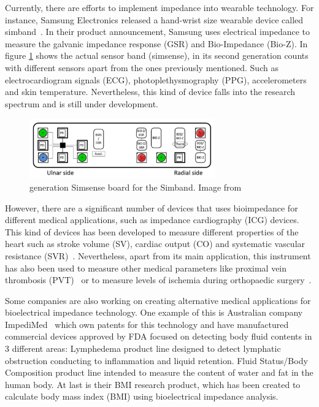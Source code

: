 Currently, there are efforts to implement impedance into wearable technology. For instance, Samsung Electronics released a hand-wrist size wearable device called simband~\cite{simsense}. In their product announcement, Samsung uses electrical impedance to measure the galvanic impedance response (GSR) and Bio-Impedance (Bio-Z). In figure \ref{fig:simsense} shows the actual sensor band (simsense), in its second generation counts with different sensors apart from the ones previously mentioned. Such as electrocardiogram signals (ECG), photoplethysmography (PPG), accelerometers and skin temperature. Nevertheless, this kind of device falls into the research spectrum and is still under development.

\begin{figure}[!htpb]
	\centering
	\includegraphics[width=8cm,keepaspectratio]{figure10}    
	\caption[ generation Simsense board for the Simband]{ generation Simsense board for the Simband. Image from \cite{simsense}}
	\label{fig:simsense}
\end{figure}

However, there are a significant number of devices that uses bioimpedance for different medical applications, such as impedance cardiography (ICG) devices. This kind of devices has been developed to measure different properties of the heart such as stroke volume (SV), cardiac output (CO) and systematic vascular resistance (SVR)~\cite{neath2005utility}.  Nevertheless, apart from its main application, this instrument has also been used to measure other medical parameters like proximal vein thrombosis (PVT)~\cite{hull1978impedance} or to measure levels of ischemia during orthopaedic surgery~\cite{distefano1973bioelectrical}.

Some companies are also working on creating alternative medical applications for bioelectrical impedance technology. One example of this is Australian company ImpediMed~\cite{impedimed} which own patents for this technology and have manufactured commercial devices approved by FDA focused on detecting body fluid contents in 3 different areas: Lymphedema product line designed to detect lymphatic obstruction conducting to inflammation and liquid retention.  Fluid Status/Body Composition product line intended to measure the content of water and fat in the human body. At last is their BMI research product, which has been created to calculate body mass index (BMI) using bioelectrical impedance analysis.

